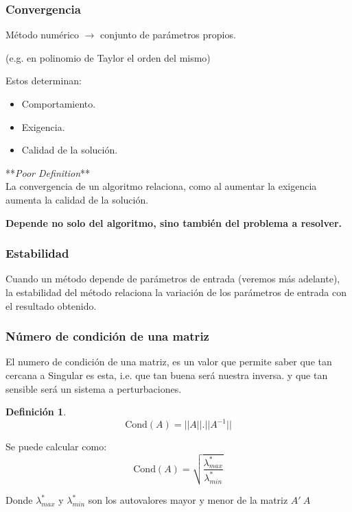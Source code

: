 \documentclass[xcolor=svgnames]{beamer} %
\theoremstyle{plain}
\renewcommand{\textbf}[1]{{\bfseries\textcolor{redUnq2}{#1}}}
\theoremstyle{definition}
\newtheorem{defi}{Definición}
\begin{document}
\begin{frame}
	\frametitle{Convergencia}

	Método numérico $\rightarrow$ conjunto de parámetros propios.
	
	(e.g. en polinomio de Taylor el orden del mismo)\vspace{10pt}
	
	Estos determinan:
\begin{itemize}
	\item Comportamiento.
	\item Exigencia.
	\item Calidad de la solución.
\end{itemize}
	 
	 
**\textit{Poor Definition}**\\
La convergencia de un algoritmo relaciona, como al aumentar la exigencia aumenta la calidad de la solución. 

\textbf{Depende no solo del algoritmo, sino también del problema a resolver.}

\end{frame}


\begin{frame}
\frametitle{Estabilidad}
Cuando un método depende de parámetros de entrada (veremos más adelante), \\
la estabilidad del método relaciona la variación de los parámetros de entrada con el resultado obtenido.

\end{frame}

\begin{frame}
\frametitle{Número de condición de una matriz}

El numero de condición de una matriz, es un valor que permite saber que tan cercana a Singular es esta, i.e. que tan buena será nuestra inversa. y que tan sensible será un sistema a perturbaciones. 

\begin{center}
\begin{minipage}{.95\linewidth}
\begin{tcolorbox}
\begin{defi}\vspace{-15pt}
	$$ \text{Cond}(A) = ||A||.||A^{-1}||$$ 
\end{defi} 
\end{tcolorbox}
\end{minipage}
\end{center}

\begin{minipage}{.45\linewidth}
Se puede calcular como:
$$ \text{Cond}(A) = \sqrt{\frac{\lambda^*_{max}}{\lambda^*_{min}}}$$
\end{minipage}
 \begin{minipage}{.45\linewidth}
Donde  $\lambda^*_{max}$ y $\lambda^*_{min}$ son los autovalores mayor y menor de la matriz $ A'\ A$
\end{minipage}


\end{frame}
\end{document}
